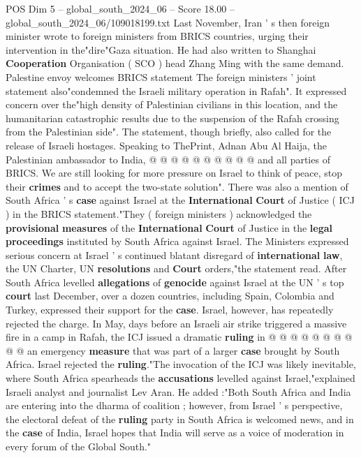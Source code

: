 \begin{textsample}{POS Dim 5 – global\_south\_2024\_06 – Score 18.00 – global\_south\_2024\_06/109018199.txt}
Last November, Iran ' s then foreign minister wrote to foreign ministers from BRICS countries, urging their intervention in the"dire"Gaza situation.
He had also written to Shanghai \textbf{Cooperation} Organisation ( SCO ) head Zhang Ming with the same demand.
Palestine envoy welcomes BRICS statement The foreign ministers ' joint statement also"condemned the Israeli military operation in Rafah".
It expressed concern over the"high density of Palestinian civilians in this location, and the humanitarian catastrophic results due to the suspension of the Rafah crossing from the Palestinian side".
The statement, though briefly, also called for the release of Israeli hostages.
Speaking to ThePrint, Adnan Abu Al Haija, the Palestinian ambassador to India, @ @ @ @ @ @ @ @ @ @ and all parties of BRICS.
We are still looking for more pressure on Israel to think of peace, stop their \textbf{crimes} and to accept the two-state solution".
There was also a mention of South Africa ' s \textbf{case} against Israel at the \textbf{International} \textbf{Court} of Justice ( ICJ ) in the BRICS statement."They ( foreign ministers ) acknowledged the \textbf{provisional} \textbf{measures} of the \textbf{International} \textbf{Court} of Justice in the \textbf{legal} \textbf{proceedings} instituted by South Africa against Israel.
The Ministers expressed serious concern at Israel ' s continued blatant disregard of \textbf{international} \textbf{law}, the UN Charter, UN \textbf{resolutions} and \textbf{Court} orders,"the statement read.
After South Africa levelled \textbf{allegations} of \textbf{genocide} against Israel at the UN ' s top \textbf{court} last December, over a dozen countries, including Spain, Colombia and Turkey, expressed their support for the \textbf{case}.
Israel, however, has repeatedly rejected the charge.
In May, days before an Israeli air strike triggered a massive fire in a camp in Rafah, the ICJ issued a dramatic \textbf{ruling} in @ @ @ @ @ @ @ @ @ @ an emergency \textbf{measure} that was part of a larger \textbf{case} brought by South Africa.
Israel rejected the \textbf{ruling}."The invocation of the ICJ was likely inevitable, where South Africa spearheads the \textbf{accusations} levelled against Israel,"explained Israeli analyst and journalist Lev Aran.
He added :"Both South Africa and India are entering into the dharma of coalition ; however, from Israel ' s perspective, the electoral defeat of the \textbf{ruling} party in South Africa is welcomed news, and in the \textbf{case} of India, Israel hopes that India will serve as a voice of moderation in every forum of the Global South."

\end{textsample}
